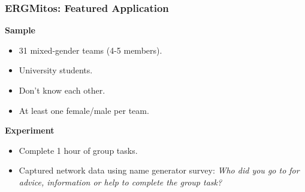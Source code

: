 \documentclass[aspectratio=169, 9pt, handout]{beamer}
\begin{document}
\begin{frame}[c]
	\frametitle{ERGMitos: Featured Application}
	
	\begin{minipage}[t]{.38\linewidth}
		\small
	\noindent \textbf{Sample}
	\pause
	\begin{itemize}
		\item 31 mixed-gender teams (4-5 members).\pause
		\item University students.\pause
		\item Don't know each other.\pause
		\item At least one female/male per team.\pause
	\end{itemize}
	\noindent \textbf{Experiment}\pause
	\begin{itemize}
		\item Complete 1 hour of group tasks.\pause
		\item Captured network data using name generator survey: \textit{Who did you go to for advice, information or help to complete the group task?}
	\end{itemize}
	\end{minipage}
\hfill
	\begin{minipage}[t]{.6\linewidth}
		\centering
	\end{minipage}
	
\end{frame}
\end{document}
